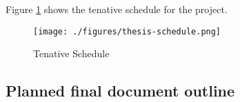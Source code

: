 Figure \ref{project-schedule} shows the tenative schedule for the project. 
\begin{landscape}

      \begin{figure}
            \centering
            \texttt{[image: ./figures/thesis-schedule.png]}
            \caption{Tenative Schedule}
            \label{project-schedule}
      \end{figure}

\end{landscape}
\subsection{Planned final document outline}
